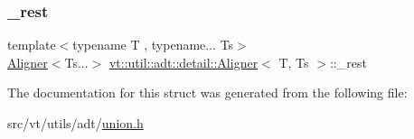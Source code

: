 \mbox{\label{structvt_1_1util_1_1adt_1_1detail_1_1_aligner_a4115223efc04e8781590dea362fc36f0}} 
\subsubsection{\texorpdfstring{\+\_\+rest}{\_rest}}
{\footnotesize\ttfamily template$<$typename T , typename... Ts$>$ \\
\hyperlink{structvt_1_1util_1_1adt_1_1detail_1_1_aligner}{Aligner}$<$Ts...$>$ \hyperlink{structvt_1_1util_1_1adt_1_1detail_1_1_aligner}{vt\+::util\+::adt\+::detail\+::\+Aligner}$<$ T, Ts $>$\+::\+\_\+rest}



The documentation for this struct was generated from the following file\+:\begin{DoxyCompactItemize}
\item 
src/vt/utils/adt/\hyperlink{union_8h}{union.\+h}\end{DoxyCompactItemize}
